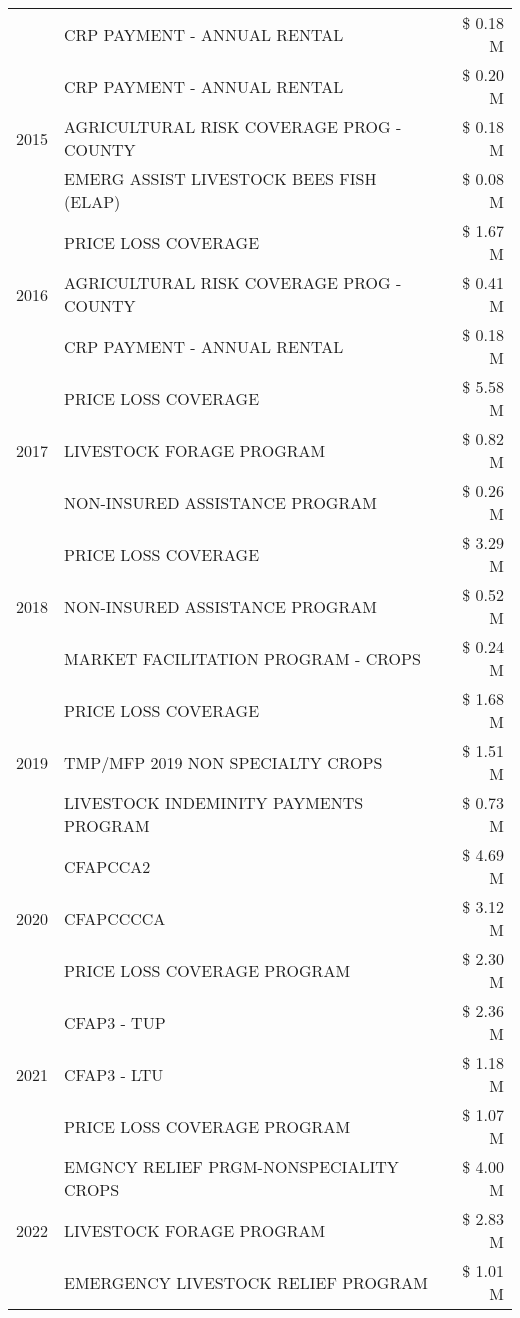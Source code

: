 \begin{tabular}{llr}
 & CRP PAYMENT - ANNUAL RENTAL & \$ 0.18 M \\
\cline{1-3}
\multirow[t]{3}{*}{2015} & CRP PAYMENT - ANNUAL RENTAL & \$ 0.20 M \\
 & AGRICULTURAL RISK COVERAGE PROG - COUNTY & \$ 0.18 M \\
 & EMERG ASSIST LIVESTOCK BEES FISH (ELAP) & \$ 0.08 M \\
\cline{1-3}
\multirow[t]{3}{*}{2016} & PRICE LOSS COVERAGE & \$ 1.67 M \\
 & AGRICULTURAL RISK COVERAGE PROG - COUNTY & \$ 0.41 M \\
 & CRP PAYMENT - ANNUAL RENTAL & \$ 0.18 M \\
\cline{1-3}
\multirow[t]{3}{*}{2017} & PRICE LOSS COVERAGE & \$ 5.58 M \\
 & LIVESTOCK FORAGE PROGRAM & \$ 0.82 M \\
 & NON-INSURED ASSISTANCE PROGRAM & \$ 0.26 M \\
\cline{1-3}
\multirow[t]{3}{*}{2018} & PRICE LOSS COVERAGE & \$ 3.29 M \\
 & NON-INSURED ASSISTANCE PROGRAM & \$ 0.52 M \\
 & MARKET FACILITATION PROGRAM - CROPS & \$ 0.24 M \\
\cline{1-3}
\multirow[t]{3}{*}{2019} & PRICE LOSS COVERAGE & \$ 1.68 M \\
 & TMP/MFP 2019 NON SPECIALTY CROPS & \$ 1.51 M \\
 & LIVESTOCK INDEMINITY PAYMENTS PROGRAM & \$ 0.73 M \\
\cline{1-3}
\multirow[t]{3}{*}{2020} & CFAPCCA2 & \$ 4.69 M \\
 & CFAPCCCCA & \$ 3.12 M \\
 & PRICE LOSS COVERAGE PROGRAM & \$ 2.30 M \\
\cline{1-3}
\multirow[t]{3}{*}{2021} & CFAP3 - TUP & \$ 2.36 M \\
 & CFAP3 - LTU & \$ 1.18 M \\
 & PRICE LOSS COVERAGE PROGRAM & \$ 1.07 M \\
\cline{1-3}
\multirow[t]{3}{*}{2022} & EMGNCY RELIEF PRGM-NONSPECIALITY CROPS & \$ 4.00 M \\
 & LIVESTOCK FORAGE PROGRAM & \$ 2.83 M \\
 & EMERGENCY LIVESTOCK RELIEF PROGRAM & \$ 1.01 M \\
\cline{1-3}
\bottomrule
\end{tabular}
